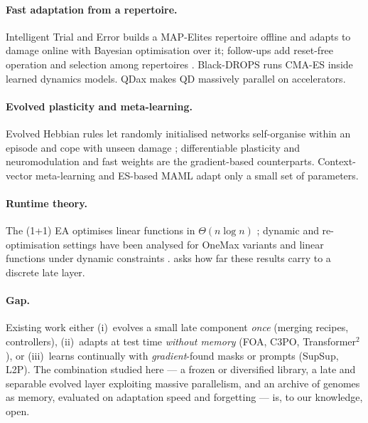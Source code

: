 \documentclass[11pt,a4paper]{article}
\theoremstyle{definition}
\theoremstyle{plain}
\theoremstyle{remark}
\begin{document}
\paragraph{Fast adaptation from a repertoire.}
Intelligent Trial and Error \cite{cully2015robots} builds a MAP-Elites \cite{mouret2015mapelites} repertoire offline and adapts to damage online with Bayesian optimisation over it; follow-ups add reset-free operation \cite{chatzilygeroudis2018rte} and selection among repertoires \cite{kaushik2020aprol}. Black-DROPS \cite{chatzilygeroudis2017blackdrops} runs CMA-ES inside learned dynamics models. QDax \cite{lim2023accelerated,chalumeau2024qdax} makes QD massively parallel on accelerators.

\paragraph{Evolved plasticity and meta-learning.}
Evolved Hebbian rules let randomly initialised networks self-organise within an episode and cope with unseen damage \cite{najarro2020hebbian}; differentiable plasticity and neuromodulation \cite{miconi2018differentiable,miconi2019backpropamine} and fast weights \cite{ba2016fastweights} are the gradient-based counterparts. Context-vector meta-learning \cite{zintgraf2019cavia} and ES-based MAML \cite{song2020esmaml} adapt only a small set of parameters.

\paragraph{Runtime theory.}
The (1+1) EA optimises linear functions in $\Theta(n\log n)$ \cite{droste2002linear,witt2013tight}; dynamic and re-optimisation settings have been analysed for OneMax variants \cite{kotzing2015dynamic} and linear functions under dynamic constraints \cite{shi2019reopt}.  asks how far these results carry to a discrete late layer.

\paragraph{Gap.}
Existing work either (i)~evolves a small late component \emph{once} (merging recipes, controllers), (ii)~adapts at test time \emph{without memory} (FOA, C3PO, Transformer$^2$), or (iii)~learns continually with \emph{gradient}-found masks or prompts (SupSup, L2P). The combination studied here --- a frozen or diversified library, a late and separable evolved layer exploiting massive parallelism, and an archive of genomes as memory, evaluated on adaptation speed and forgetting --- is, to our knowledge, open.
\end{document}

